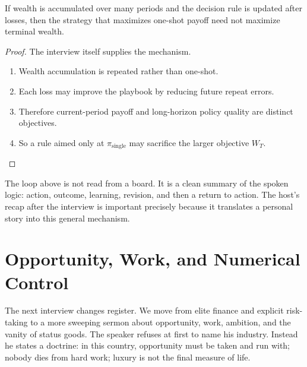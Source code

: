\begin{proposition}
If wealth is accumulated over many periods and the decision rule is updated after losses, then the strategy that maximizes one-shot payoff need not maximize terminal wealth.
\end{proposition}

\begin{proof}
The interview itself supplies the mechanism.
\begin{enumerate}
\item Wealth accumulation is repeated rather than one-shot.
\item Each loss may improve the playbook by reducing future repeat errors.
\item Therefore current-period payoff and long-horizon policy quality are distinct objectives.
\item So a rule aimed only at \(\pi_{\mathrm{single}}\) may sacrifice the larger objective \(W_T\).
\end{enumerate}
\end{proof}

\begin{figure}
\centering
{}
\end{figure}

The loop above is not read from a board. It is a clean summary of the spoken logic: action, outcome, learning, revision, and then a return to action. The host's recap after the interview is important precisely because it translates a personal story into this general mechanism.

\section{Opportunity, Work, and Numerical Control}

The next interview changes register. We move from elite finance and explicit risk-taking to a more sweeping sermon about opportunity, work, ambition, and the vanity of status goods. The speaker refuses at first to name his industry. Instead he states a doctrine: in this country, opportunity must be taken and run with; nobody dies from hard work; luxury is not the final measure of life.

